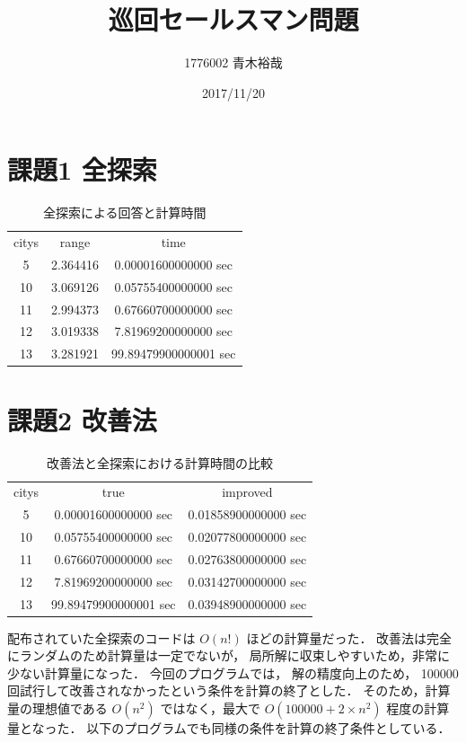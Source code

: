 \documentclass{jsarticle}
\title{巡回セールスマン問題}
\author{1776002 青木裕哉}
\date{2017/11/20}
\begin{document}
\fontsize{10pt}{12pt}\selectfont
\maketitle

\section{課題1 全探索}
\begin{table}[htb]
  \centering
	\begin{tabular}[p]{ccc}
		\toprule
		citys & range & time \\
		5 & 2.364416 & 0.00001600000000 sec \\
		10 & 3.069126 & 0.05755400000000 sec \\
		11 & 2.994373 & 0.67660700000000 sec \\
		12 & 3.019338 & 7.81969200000000 sec \\
		13 & 3.281921 & 99.89479900000001 sec \\
		\bottomrule
	\end{tabular}
	\caption{全探索による回答と計算時間}
\end{table}


\section{課題2 改善法}
\begin{table}[htb]
  \centering
	\begin{tabular}[p]{ccc}
		\toprule
		citys & true & improved \\
		5  & 0.00001600000000 sec  &  0.01858900000000 sec \\
		10 & 0.05755400000000 sec  &  0.02077800000000 sec \\
		11 & 0.67660700000000 sec  &  0.02763800000000 sec \\
		12 & 7.81969200000000 sec  &  0.03142700000000 sec \\
		13 & 99.89479900000001 sec &  0.03948900000000 sec \\
		\bottomrule
	\end{tabular}
	  \caption{改善法と全探索における計算時間の比較}
\end{table}

配布されていた全探索のコードは
$O(n!)$ ほどの計算量だった．
改善法は完全にランダムのため計算量は一定でないが，
局所解に収束しやすいため，非常に少ない計算量になった．
今回のプログラムでは，
解の精度向上のため，
100000回試行して改善されなかったという条件を計算の終了とした．
そのため，計算量の理想値である
$O(n^2)$
ではなく，最大で
$O(100000 + 2 \times n^2)$
程度の計算量となった．
以下のプログラムでも同様の条件を計算の終了条件としている．
\end{document}
